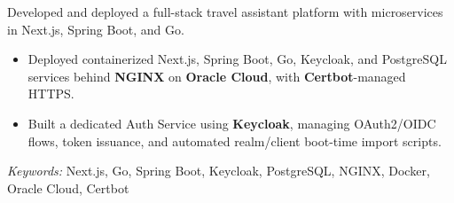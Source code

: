 \noindent 
{}
 
\noindent 
Developed and deployed a full-stack travel assistant platform with microservices in Next.js, Spring Boot, and Go. 

\begin{itemize} 
    \item Deployed containerized Next.js, Spring Boot, Go, Keycloak, and PostgreSQL services behind \textbf{NGINX} on \textbf{Oracle Cloud}, with \textbf{Certbot}-managed HTTPS.
    \item Built a dedicated Auth Service using \textbf{Keycloak}, managing OAuth2/OIDC flows, token issuance, and automated realm/client boot-time import scripts.
\end{itemize} 
 
\noindent 
\textit{Keywords:} Next.js, Go, Spring Boot, Keycloak, PostgreSQL, NGINX, Docker, Oracle Cloud, Certbot
